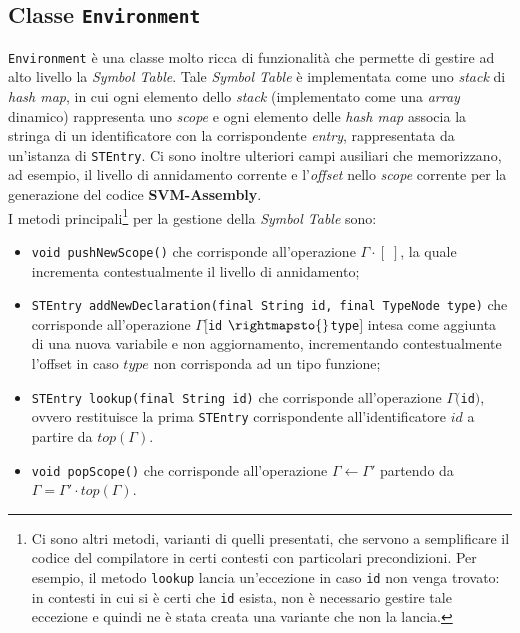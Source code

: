 \documentclass[../report.tex]{subfiles}
\begin{document}
\subsection[Classe Environment]{Classe \texttt{Environment}}
\verb|Environment| è una classe molto ricca di funzionalità che permette di gestire ad alto livello la \textit{Symbol Table}. Tale \textit{Symbol Table} è implementata come uno \textit{stack} di \textit{hash map}, in cui ogni elemento dello \textit{stack} (implementato come una \textit{array} dinamico) rappresenta uno \textit{scope} e ogni elemento delle \textit{hash map} associa la stringa di un identificatore con la corrispondente \textit{entry}, rappresentata da un'istanza di \verb|STEntry|.
Ci sono inoltre ulteriori campi ausiliari che memorizzano, ad esempio, il livello di annidamento corrente e l'\textit{offset} nello \textit{scope} corrente per la generazione del codice \textbf{SVM-Assembly}.\\
I metodi principali\footnote{Ci sono altri metodi, varianti di quelli presentati, che servono a semplificare il codice del compilatore in certi contesti con particolari precondizioni. Per esempio, il metodo \texttt{lookup} lancia un'eccezione in caso \texttt{id} non venga trovato: in contesti in cui si è certi che \texttt{id} esista, non è necessario gestire tale eccezione e quindi ne è stata creata una variante che non la lancia.} per la gestione della \textit{Symbol Table} sono:
\begin{itemize}
    \item \verb|void pushNewScope()| che corrisponde all'operazione $\Gamma{}\cdot{}[\;]$, la quale incrementa contestualmente il livello di annidamento;
    \item \verb|STEntry addNewDeclaration(final String id, final TypeNode type)| che corrisponde all'operazione $\Gamma{}[$\verb|id| $ \rightmapsto{}$\verb|type|$]$ intesa come aggiunta di una nuova variabile e non aggiornamento, incrementando contestualmente l'offset in caso $type$ non corrisponda ad un tipo funzione;
    \item \verb|STEntry lookup(final String id)| che corrisponde all'operazione $\Gamma($\verb|id|$)$, ovvero restituisce la prima \verb|STEntry| corrispondente all'identificatore $id$ a partire da $top(\Gamma)$.
    \item \verb|void popScope()| che corrisponde all'operazione $\Gamma \leftarrow{} \Gamma'$ partendo da $\Gamma = \Gamma'\cdot{}top(\Gamma)$.
\end{itemize}
\end{document}
